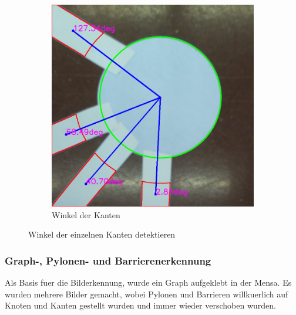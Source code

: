 \begin{enumerate}
\begin{figure}[H]
\begin{subfigure}{0.4\textwidth}
        \includegraphics[width=0.95\linewidth]{assets/informatik-prototyp/opencv/angle_detection/node_with_edge_angles_annotated.png} 
        \caption{Winkel der Kanten}
        \label{fig:angle-lines}
        \end{subfigure}
        \caption{Winkel der einzelnen Kanten detektieren}
        \label{fig:node-with-edge-angles}
        \end{figure}
\end{enumerate}

\subsubsection{Graph-, Pylonen- und Barrierenerkennung}




Als Basis fuer die Bilderkennung, wurde ein Graph aufgeklebt in der Mensa. Es wurden mehrere Bilder gemacht, wobei Pylonen und Barrieren willkuerlich auf Knoten und Kanten gestellt wurden und immer wieder verschoben wurden.

